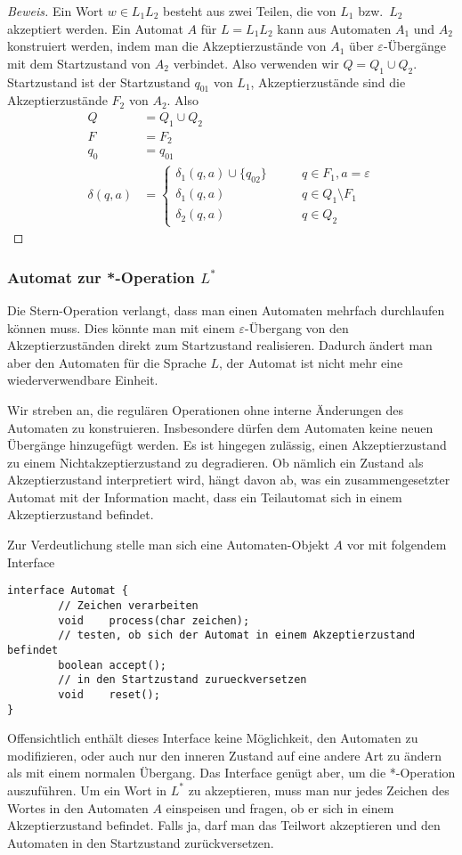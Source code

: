 \begin{proof}[Beweis]
Ein Wort $w\in L_1L_2$ besteht aus zwei Teilen, die von $L_1$
bzw.~$L_2$ akzeptiert werden.
Ein Automat $A$ für $L=L_1L_2$ kann aus Automaten $A_1$ und $A_2$
konstruiert werden, indem man
die Akzeptierzustände von $A_1$ über $\varepsilon$-Übergänge
mit dem Startzustand von $A_2$ verbindet.
Also verwenden wir $Q=Q_1\cup Q_2$.
Startzustand ist der Startzustand $q_{01}$ von $L_1$, Akzeptierzustände
sind die Akzeptierzustände $F_2$ von $A_2$.
Also
\begin{align*}
Q&=Q_1\cup Q_2\\
F&=F_2\\
q_0&=q_{01}\\
\delta(q,a)&=\begin{cases}
\delta_1(q,a)\cup\{q_{02}\}&\qquad q\in F_1, a=\varepsilon\\
\delta_1(q,a)&\qquad q\in Q_1\setminus F_1\\
\delta_2(q,a)&\qquad q\in Q_2
\end{cases}
\end{align*}
\end{proof}

\subsubsection{Automat zur *-Operation $L^*$}
Die Stern-Operation verlangt, dass man einen Automaten mehrfach
durchlaufen können muss.
Dies könnte man mit einem $\varepsilon$-Übergang
von den Akzeptierzuständen direkt zum Startzustand realisieren.
Dadurch ändert man aber den Automaten für die Sprache $L$,
der Automat ist nicht mehr eine wiederverwendbare Einheit.

Wir streben an, die regulären Operationen ohne interne Änderungen
des Automaten zu konstruieren.
Insbesondere dürfen dem Automaten keine neuen Übergänge hinzugefügt
werden.
Es ist hingegen zulässig, einen Akzeptierzustand zu einem
Nichtakzeptierzustand zu degradieren.
Ob nämlich ein Zustand als Akzeptierzustand interpretiert wird,
hängt davon ab, was ein zusammengesetzter Automat mit der Information
macht, dass ein Teilautomat sich in einem Akzeptierzustand befindet.

Zur Verdeutlichung stelle man sich eine Automaten-Objekt $A$ vor mit
folgendem Interface
\begin{verbatim}
interface Automat {
        // Zeichen verarbeiten
        void    process(char zeichen);
        // testen, ob sich der Automat in einem Akzeptierzustand befindet
        boolean accept();
        // in den Startzustand zurueckversetzen
        void    reset();
}
\end{verbatim}
Offensichtlich enthält dieses Interface keine Möglichkeit, den Automaten
zu modifizieren, oder auch nur den inneren Zustand auf eine andere Art
zu ändern als mit einem normalen Übergang.
Das Interface genügt aber, um die *-Operation auszuführen.
Um ein Wort in $L^*$ zu akzeptieren, muss man nur jedes Zeichen
des Wortes in den Automaten $A$ einspeisen und fragen, ob er sich
in einem Akzeptierzustand befindet.
Falls ja, darf man das Teilwort
akzeptieren und den Automaten in den Startzustand zurückversetzen.

